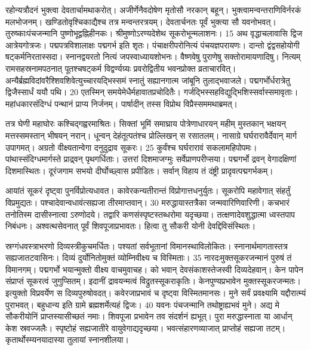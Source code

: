 रहोन्यत्रौदनं भुक्त्वा देवतार्चामथाकरोत्।
 अजीर्णेनैवदोषेण मृतोसौ नरकान् बहून्।
 भुक्त्वामन्वन्तराणिविर्नरकं मलभोजनम्।
 खण्डितोवृश्चिकाद्यैश्च तत्र मन्वन्तरत्रयम्।
 देवतार्चनतः पूर्वं भुक्त्या सौ यवनोभवत्।
 तुरुष्काःपंचजन्मानि पुष्णोभूद्वह्निहीनकः।
 श्रीमुष्णोऽरण्यदेशेथ सूकरोभून्मलाशनः।
 15 अथ वृद्धाचलावासि द्विज आत्रेयगोत्रजः।
 पद्मपत्रविशालाक्षः पद्मगर्भ इति शृतः।
 पंचाक्षरीपरोनित्यं पंचयज्ञपरायणः।
 दान्तो द्वंद्वसहोयोगी षट्कर्मनिरतास्सदा।
 स्नानद्वयरतो नित्यं जपस्वाध्यायशोभनः।
 वैष्णवेषु पुराणेषु सक्तोरामायणादिषु।
 नित्यम् रामसहस्रनामपठनात् पूतश्चषट्कर्म विद्वर्ण्यग्र्यः प्रवरोद्वितीय भवनप्रोक्त व्रताचारवित्।
 अन्यैर्ब्रह्मविदांवरैश्शिवशिवेत्युच्चारयद्भिस्समं स्नातुं सह्यानगात्म जांबूनि तुलाद्भवाजले।
 पद्मगर्भोर्धरात्रेतु द्विजैस्सार्धं ययौ पथि।
 20 एतस्मिन् समयेमेधैर्महावातप्रचोदितैः।
 गर्जद्भिस्सहविद्युद्भिशिस्सर्वास्समावृताः।
 महांधकारसंदिग्धं पन्थानं प्राप्य निर्जनम्।
 पार्षादीन् तस्स विप्रोथ विप्रैस्सममथाब्रमत्।
 
तत्र घेणी महाघोरः कश्चिद्गह्वरमाश्रितः।
 सिक्तां भूमिं समाघ्राय पोत्रेणाधारयन् महीम् मुस्तकान् भक्षयन् मत्तस्समस्तान् भीषयन् नरान्।
 धून्वन् देहंतूत्पतंश्च प्रोल्लिखन् स रसातलम्।
 नासाग्रे घर्घरारावैर्देवान् मार्ग उपागमत्।
 अग्रतो वीक्ष्यतान्वेगा दनुदुद्राव सूकरः।
 25 कुर्वंश्च घर्घरारावं सकलामहिपोपमः।
 पांथास्संदिग्धमार्गस्ते प्राद्र्वन् पृथगर्धिताः।
 उत्तरां दिशमाजग्मुः सर्वेप्राणपरीप्सया।
 पद्मगर्भो द्रवन् वेगादक्षिणां दिशमास्थितः।
 दूरंजगाम सभयो दीर्घोच्छ्वास प्रपीडितः।
 सर्वान् विहाय तं दंष्ट्री प्रादृवत्पद्मगर्भकम्।
 
आयांतं सूकरं दृष्ट्वा पुनर्विप्रोत्यधावत।
 कावेरकन्यतीरान्तं विप्रोगात्तधनुर्युतः।
 सूकरोपि महावेगात् संहर्तुं विप्रमुद्यतः।
 पश्चादेवान्वधावंत्सह्यजा तीरमाप्तवान्।
 30 मरुद्धायास्तत्रैका जन्मवारिणिवारिणी।
 कचभारं तनोतिस्म दासीस्नात्वा ऽरुणोदये।
 तद्वारि कणसंस्पृष्टस्तब्धरोमा यदृच्छया।
 तत्क्षणादेवशुद्धात्मा ध्वस्तपाप निबंधनः।
 अश्वत्थसेवनात् पूर्वं शिवपूजाप्रभावतः।
 हित्वा तु सौकरी योनी देवद्दिविसंस्थितः।
 
स्रग्गंधवस्त्राभरणो दिव्यस्त्रीकुचमर्धितः।
 पश्यतां सर्वभूतानां विमानस्थाविलोकितः।
 स्नानार्थमागतास्तत्र सह्यजातटवासिनः।
 दिव्यं दुर्योनितोमुक्तं व्योम्निवीक्ष्य च विस्मिताः।
 35 नारदःमुक्तसूकरजन्मानं पुरुषं तं विमानगम्।
 पद्मगर्भो भयान्मुक्तो वीक्ष्य वाचमुवाचह।
 को भवान् देवसंकाशस्तेजस्वी दिव्यदेहवान्।
 केन पापेन संप्राप्तं सूकरत्वं जुगुप्सितम्।
 इदानीं द्रावयन्मत्वं विद्रुतस्सूकराकृतिः।
 केनपुण्यप्रभावेन मुक्तस्सूकरजन्मतः।
 इत्युक्तो विप्रवर्येण स दिव्यपुरुषोवदत्।
 कवेरजाप्रभावं च दृष्ट्वा विस्मितमानसः।
 मुने सर्वं प्रवक्ष्यामि यद्दौरात्म्यं पुराभवत्।
 बहुधान्य इति ग्रामे ब्रह्मशर्मेत्यहं द्विजः।
 40 यवनः पंचजन्मानि तथोष्ट्राह्यभवं मुने।
 अद्य मे सौकरीयोनिं प्राप्तस्यासीच्छतं नमाः।
 शिवपूजा प्रभावेन तव संदर्शनं ह्यभूत्।
 पुरा मरुद्धास्नाता या आर्धान् केश स्रवज्जलैः।
 स्पृष्टोहं सह्यजातीरे वायुवेगाद्यदृच्छया।
 भवत्संहारणव्याजात् प्राप्तोहं सह्यजा तटम्।
 कृतार्थोस्म्यनयादास्या तुलायां स्नानशीलया।
 
